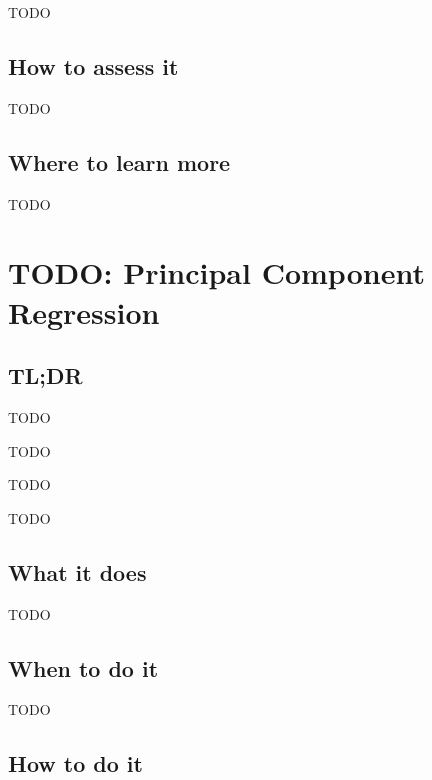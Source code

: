 \documentclass[
]{book}
\providecommand{\tightlist}{%
  \setlength{\itemsep}{0pt}\setlength{\parskip}{0pt}}
\begin{document}
TODO

\hypertarget{how-to-assess-it-14}{%
\section{How to assess it}\label{how-to-assess-it-14}}

TODO

\hypertarget{where-to-learn-more-14}{%
\section{Where to learn more}\label{where-to-learn-more-14}}

TODO

\hypertarget{principal-component-regression}{%
\chapter{TODO: Principal Component Regression}\label{principal-component-regression}}

\hypertarget{tldr-15}{%
\section{TL;DR}\label{tldr-15}}

\begin{description}
\tightlist
\item[What it does]
TODO
\item[When to do it]
TODO
\item[How to do it]
TODO
\item[How to assess it]
TODO
\end{description}

\hypertarget{what-it-does-15}{%
\section{What it does}\label{what-it-does-15}}

TODO

\hypertarget{when-to-do-it-15}{%
\section{When to do it}\label{when-to-do-it-15}}

TODO

\hypertarget{how-to-do-it-15}{%
\section{How to do it}\label{how-to-do-it-15}}
\end{document}
